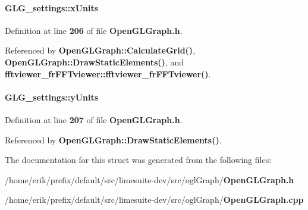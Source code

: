 \paragraph[{x\+Units}]{ G\+L\+G\+\_\+settings\+::x\+Units}\label{structGLG__settings_a9e977401fcf81ec809d544428054c4e3}


Definition at line {\bf 206} of file {\bf Open\+G\+L\+Graph.\+h}.



Referenced by {\bf Open\+G\+L\+Graph\+::\+Calculate\+Grid()}, {\bf Open\+G\+L\+Graph\+::\+Draw\+Static\+Elements()}, and {\bf fftviewer\+\_\+fr\+F\+F\+Tviewer\+::fftviewer\+\_\+fr\+F\+F\+Tviewer()}.

\paragraph[{y\+Units}]{ G\+L\+G\+\_\+settings\+::y\+Units}\label{structGLG__settings_aa83a8ff7a5c73c8fe60899a08cc279ad}


Definition at line {\bf 207} of file {\bf Open\+G\+L\+Graph.\+h}.



Referenced by {\bf Open\+G\+L\+Graph\+::\+Draw\+Static\+Elements()}.



The documentation for this struct was generated from the following files\+:\begin{DoxyCompactItemize}
\item 
/home/erik/prefix/default/src/limesuite-\/dev/src/ogl\+Graph/{\bf Open\+G\+L\+Graph.\+h}\item 
/home/erik/prefix/default/src/limesuite-\/dev/src/ogl\+Graph/{\bf Open\+G\+L\+Graph.\+cpp}\end{DoxyCompactItemize}
